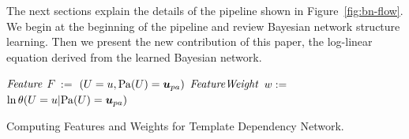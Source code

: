 \documentclass[runningheads,a4paper]{llncs}
\begin{document}
The next sections explain the details of the pipeline shown in Figure~\ref{fig:bn-flow}.
We begin at the beginning of the pipeline and review Bayesian network structure learning. Then we present the new contribution of this paper, the log-linear equation derived from the learned Bayesian network.


\begin{algorithm}[htbp]
{}
\begin{algorithmic}[1]
			\STATE $\it{Feature}$ $F$  $:=$ $(\Appendterm{\UT  = \UV} {\Pa{\UT} = \Prange{\UT}})$ 
			\STATE  $\it{FeatureWeight} $ $w:=$ $\ln\cprob{\UT = \UV}{\Pa{\UT} = \Prange{\UT}}$
			\ENDIF \\	
		\ENDFOR
	\ENDFOR
\ENDFOR 
\ENDFOR
\STATE {}
\end{algorithmic}
\caption{Computing Features and Weights for Template Dependency Network. \label{alg:dnfeatures}
}
\end{algorithm}
\end{document}

